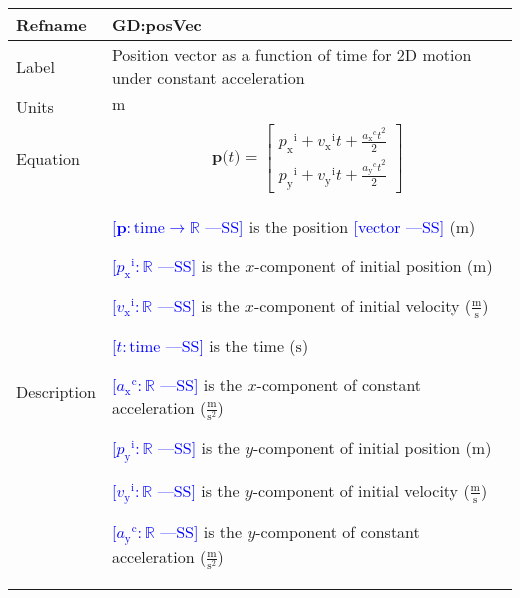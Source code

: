 \documentclass[12pt]{article}
\newcommand{\authornote}[3]{\textcolor{#1}{[#3 ---#2]}}
\newcommand{\authornote}[3]{}
\newcommand{\wss}[1]{\authornote{blue}{SS}{#1}}
\begin{document}
\medskip
\noindent
\begin{minipage}{\textwidth}
\begin{tabular}{>{\raggedright}p{}>{\raggedright\arraybackslash}p{}}
\toprule \textbf{Refname} & \textbf{GD:posVec}
\label{GD:posVec}
\\ \midrule
Label & Position vector as a function of time for 2D motion under constant acceleration
        
\\ \midrule
Units & ${\text{m}}$
        
\\ \midrule
Equation & \begin{displaymath}
           \symbf{p}\text{(}t\text{)}=\begin{bmatrix}
                                      {{p_{\text{x}}}^{\text{i}}}+{{v_{\text{x}}}^{\text{i}}} t+\frac{{{a_{\text{x}}}^{\text{c}}} t^{2}}{2}\\
                                      {{p_{\text{y}}}^{\text{i}}}+{{v_{\text{y}}}^{\text{i}}} t+\frac{{{a_{\text{y}}}^{\text{c}}} t^{2}}{2}
                                      \end{bmatrix}
           \end{displaymath}
\\ \midrule
Description & \begin{symbDescription}
              \item{\wss{$\symbf{p}: \text{time} \rightarrow \mathbb{R}$} is the position \wss{vector} (${\text{m}}$)}
              \item{\wss{${{p_{\text{x}}}^{\text{i}}}: \mathbb{R}$} is the $x$-component of initial position (${\text{m}}$)}
              \item{\wss{${{v_{\text{x}}}^{\text{i}}}: \mathbb{R}$} is the $x$-component of initial velocity ($\frac{\text{m}}{\text{s}}$)}
              \item{\wss{$t: \text{time}$} is the time (${\text{s}}$)}
              \item{\wss{${{a_{\text{x}}}^{\text{c}}}: \mathbb{R}$} is the $x$-component of constant acceleration ($\frac{\text{m}}{\text{s}^{2}}$)}
              \item{\wss{${{p_{\text{y}}}^{\text{i}}}: \mathbb{R}$} is the $y$-component of initial position (${\text{m}}$)}
              \item{\wss{${{v_{\text{y}}}^{\text{i}}}: \mathbb{R}$} is the $y$-component of initial velocity ($\frac{\text{m}}{\text{s}}$)}
              \item{\wss{${{a_{\text{y}}}^{\text{c}}}: \mathbb{R}$} is the $y$-component of constant acceleration ($\frac{\text{m}}{\text{s}^{2}}$)}
              \end{symbDescription}


\end{tabular}
\end{minipage}
\end{document}
